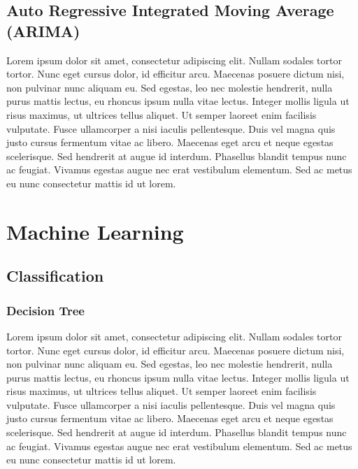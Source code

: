 \subsection{Auto Regressive Integrated Moving Average (ARIMA)}
Lorem ipsum dolor sit amet, consectetur adipiscing elit. Nullam sodales tortor tortor. Nunc eget cursus dolor, id efficitur arcu. Maecenas posuere dictum nisi, non pulvinar nunc aliquam eu. Sed egestas, leo nec molestie hendrerit, nulla purus mattis lectus, eu rhoncus ipsum nulla vitae lectus. Integer mollis ligula ut risus maximus, ut ultrices tellus aliquet. Ut semper laoreet enim facilisis vulputate. Fusce ullamcorper a nisi iaculis pellentesque. Duis vel magna quis justo cursus fermentum vitae ac libero. Maecenas eget arcu et neque egestas scelerisque. Sed hendrerit at augue id interdum. Phasellus blandit tempus nunc ac feugiat. Vivamus egestas augue nec erat vestibulum elementum. Sed ac metus eu nunc consectetur mattis id ut lorem.

\section{Machine Learning}

\subsection{Classification}

\subsubsection{Decision Tree}
Lorem ipsum dolor sit amet, consectetur adipiscing elit. Nullam sodales tortor tortor. Nunc eget cursus dolor, id efficitur arcu. Maecenas posuere dictum nisi, non pulvinar nunc aliquam eu. Sed egestas, leo nec molestie hendrerit, nulla purus mattis lectus, eu rhoncus ipsum nulla vitae lectus. Integer mollis ligula ut risus maximus, ut ultrices tellus aliquet. Ut semper laoreet enim facilisis vulputate. Fusce ullamcorper a nisi iaculis pellentesque. Duis vel magna quis justo cursus fermentum vitae ac libero. Maecenas eget arcu et neque egestas scelerisque. Sed hendrerit at augue id interdum. Phasellus blandit tempus nunc ac feugiat. Vivamus egestas augue nec erat vestibulum elementum. Sed ac metus eu nunc consectetur mattis id ut lorem.

